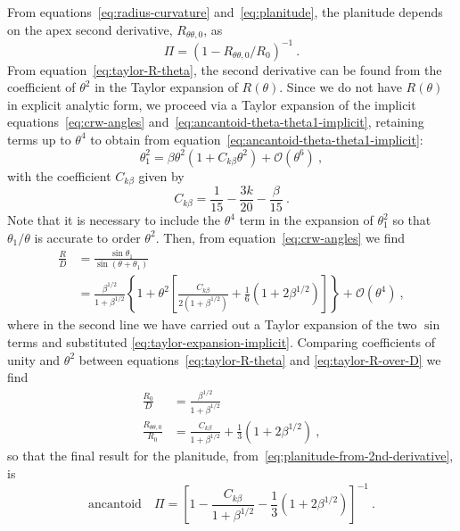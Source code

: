 From equations~\eqref{eq:radius-curvature} and~\eqref{eq:planitude},
the planitude depends on the apex second derivative,
\(R_{\theta\theta,0}\), as
\begin{equation}
  \label{eq:planitude-from-2nd-derivative}
  \Pi = \left(  1 - R_{\theta\theta,0} / R_0\right)^{-1} \ .
\end{equation}
From equation~\eqref{eq:taylor-R-theta}, the second derivative can be
found from the coefficient of \(\theta^2\) in the Taylor expansion
of \(R(\theta)\).  Since we do not have \(R(\theta)\) in explicit analytic form,
we proceed via a Taylor expansion of the implicit
equations~\eqref{eq:crw-angles}
and~\eqref{eq:ancantoid-theta-theta1-implicit}, retaining terms up to
\(\theta^4\) to obtain from
equation~\eqref{eq:ancantoid-theta-theta1-implicit}:
\begin{equation}
  \label{eq:taylor-expansion-implicit}
  \theta_1^2 = \beta \theta^2 \left( 1 + C_{k\beta} \theta^2\right) + \mathcal{O}(\theta^6)\ , 
\end{equation}
with the coefficient \(C_{k\beta}\) given by
\begin{equation}
  \label{eq:C-k-beta}
  C_{k\beta} = \frac{1}{15} - \frac{3k}{20} - \frac{\beta}{15}  \ .
\end{equation}
Note that it is necessary to include the \(\theta^4\) term in the expansion
of \(\theta_1^2\) so that \(\theta_1/\theta\) is accurate to order
\(\theta^2\).  Then, from equation~\eqref{eq:crw-angles} we find
\begin{align}
  \label{eq:taylor-R-over-D}
  \frac{R}{D} & = \frac{\sin \theta_1} {\sin (\theta + \theta_1)} \nonumber \\
              & = \frac{\beta^{1/2}}{1+\beta^{1/2}}
                \left\lbrace 1 + \theta^2
                \left[ \frac{C_{k\beta}} {2 \left(1+\beta^{1/2}\right)}
                + \frac{1}{6} \left(1+2\beta^{1/2} \right)
                \right]
                \right\rbrace + \mathcal{O}(\theta^4) \ ,
\end{align}
where in the second line we have carried out a Taylor expansion of the
two \(\sin\) terms and substituted
\eqref{eq:taylor-expansion-implicit}.  Comparing coefficients of unity
and \(\theta^2\) between equations~\eqref{eq:taylor-R-theta} and
\eqref{eq:taylor-R-over-D} we find
\begin{align}
  \label{eq:again-R0-over-D}
  \frac{R_0} {D} &= \frac{\beta^{1/2}}{1+\beta^{1/2}} \\
  \label{eq:final-second-derivative}
  \frac{R_{\theta\theta,0}} {R_0} &= \frac{C_{k\beta}}{1+\beta^{1/2}}+\frac{1}{3}\left(1+2\beta^{1/2}\right) \ ,
\end{align}
so that the final result for the planitude, from~\eqref{eq:planitude-from-2nd-derivative}, is
\begin{equation}
  \label{eq:final-planitude}
  \text{ancantoid} \quad
  \Pi = \left[ {1 - \frac{C_{k\beta}}{1+\beta^{1/2}} - \frac{1}{3}\left(1+2\beta^{1/2}\right)}
  \right]^{-1} \ .
\end{equation}

